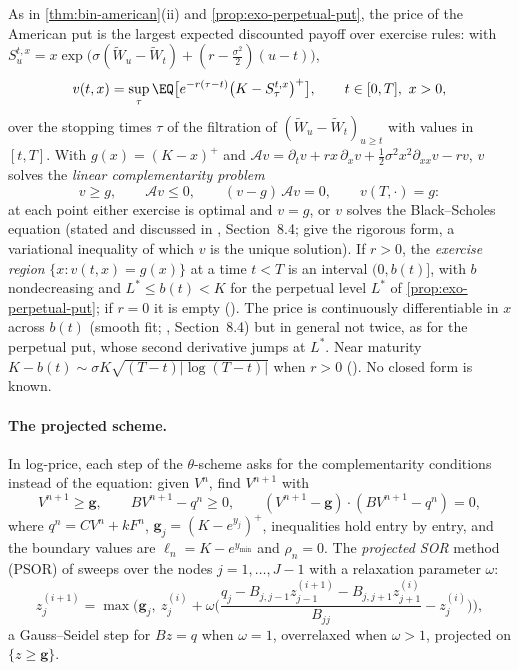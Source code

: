 As in \cref{thm:bin-american}(ii) and \cref{prop:exo-perpetual-put}, the price of the American put is
the largest expected discounted payoff over exercise rules: with
$S^{t,x}_u=x\exp\big(\sigma(\widetilde W_u-\widetilde W_t)+(r-\frac{\sigma^2}2)(u-t)\big)$,
\begin{equation}\label{eq:num-american}
  v(t,x)=\sup_\tau\EQ\big[e^{-r(\tau-t)}\big(K-S^{t,x}_\tau\big)^+\big],\qquad t\in[0,T],\ x>0,
\end{equation}
over the stopping times $\tau$ of the filtration of $(\widetilde W_u-\widetilde W_t)_{u\ge t}$ with values in
$[t,T]$. With $g(x)=(K-x)^+$ and $\mathcal Av=\partial_tv+rx\,\partial_xv+\frac12\sigma^2x^2\partial_{xx}v-rv$, $v$ solves the
\emph{linear complementarity problem}
\begin{equation}\label{eq:num-lcp-continuous}
  v\ge g,\qquad\mathcal Av\le0,\qquad(v-g)\,\mathcal Av=0,\qquad v(T,\cdot)=g:
\end{equation}
at each point either exercise is optimal and $v=g$, or $v$ solves the Black--Scholes equation
(stated and discussed in \textcite{shreve2}, Section~8.4;
\textcite{jaillet-lamberton-lapeyre-1990} give the rigorous form, a variational inequality of which
$v$ is the unique solution). If $r>0$, the \emph{exercise region} $\{x:v(t,x)=g(x)\}$ at a time $t<T$
is an interval $(0,b(t)]$, with $b$ nondecreasing and $L^*\le b(t)<K$ for the perpetual level $L^*$ of
\cref{prop:exo-perpetual-put}; if $r=0$ it is empty (). The price is
continuously differentiable in $x$ across $b(t)$ (smooth fit; \textcite{shreve2}, Section~8.4) but in
general not twice, as for the perpetual put, whose second derivative jumps at $L^*$. Near maturity
$K-b(t)\sim\sigma K\sqrt{(T-t)|\log(T-t)|}$ when $r>0$ (\textcite{barles-critical-price}). No closed form
is known.

\paragraph{The projected scheme.} In log-price, each step of the $\theta$-scheme asks for the
complementarity conditions instead of the equation: given $V^n$, find $V^{n+1}$ with
\begin{equation}\label{eq:num-lcp}
  V^{n+1}\ge\mathbf g,\qquad BV^{n+1}-q^n\ge0,\qquad(V^{n+1}-\mathbf g)\cdot(BV^{n+1}-q^n)=0,
\end{equation}
where $q^n=CV^n+kF^n$, $\mathbf g_j=(K-e^{y_j})^+$, inequalities hold entry by entry, and the boundary
values are $\ell_n=K-e^{y_{\min}}$ and $\rho_n=0$. The \emph{projected SOR} method (PSOR) of
\textcite{cryer-1971} sweeps over the nodes $j=1,\dots,J-1$ with a relaxation parameter $\omega$:
\begin{equation}\label{eq:num-psor}
  z^{(i+1)}_j=\max\Big(\mathbf g_j,\ z^{(i)}_j+\omega\Big(\frac{q_j-B_{j,j-1}z^{(i+1)}_{j-1}-B_{j,j+1}z^{(i)}_{j+1}}{B_{jj}}-z^{(i)}_j\Big)\Big),
\end{equation}
a Gauss--Seidel step for $Bz=q$ when $\omega=1$, overrelaxed when $\omega>1$, projected on $\{z\ge\mathbf g\}$.

